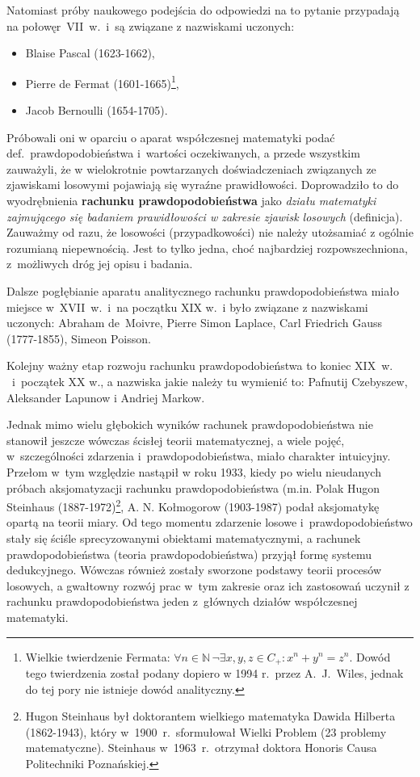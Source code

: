 \documentclass[10pt,a4paper]{article}
\begin{document}
Natomiast próby naukowego podejścia do odpowiedzi na to pytanie przypadają
na połowęr~VII~w.\ i~są związane z nazwiskami uczonych:
\begin{itemize}
  \item Blaise Pascal (1623-1662),
  \item Pierre de Fermat (1601-1665)\footnote{Wielkie twierdzenie Fermata:
      $\forall n\in\mathbb{N}\,\neg\exists x,y,z\in C_+: x^n+y^n=z^n$.
      Dowód tego twierdzenia został podany dopiero w 1994 r.\ przez A.\ J.\ Wiles,
      jednak do tej pory nie istnieje dowód analityczny.},
  \item Jacob Bernoulli (1654-1705).
\end{itemize}


Próbowali oni w oparciu o aparat współczesnej matematyki podać
def.~prawdopodobieństwa i~wartości oczekiwanych, a przede wszystkim zauważyli,
że w wielokrotnie powtarzanych doświadczeniach związanych ze zjawiskami losowymi
pojawiają się wyraźne prawidłowości. Doprowadziło to do wyodrębnienia
\textbf{rachunku prawdopodobieństwa} jako \textit{działu matematyki zajmującego
  się badaniem prawidłowości w zakresie zjawisk losowych} (definicja). Zauważmy
od razu, że losowości (przypadkowości) nie należy utożsamiać z ogólnie rozumianą
niepewnością. Jest to tylko jedna, choć najbardziej rozpowszechniona,
z~możliwych dróg jej opisu i badania.

Dalsze pogłębianie aparatu analitycznego rachunku prawdopodobieństwa miało
miejsce w~XVII~w.\ i~na początku XIX w.\ i było związane z nazwiskami uczonych:
Abraham de~Moivre, Pierre Simon Laplace, Carl Friedrich Gauss (1777-1855),
Simeon Poisson.

Kolejny ważny etap rozwoju rachunku prawdopodobieństwa to koniec XIX~w.
\ i~początek XX w., a nazwiska jakie należy tu wymienić to:
Pafnutij Czebyszew, Aleksander Lapunow i Andriej Markow.

Jednak mimo wielu głębokich wyników rachunek prawdopodobieństwa nie stanowił
jeszcze wówczas ścisłej teorii matematycznej, a wiele pojęć, w~szczególności
zdarzenia i~prawdopodobieństwa, miało charakter intuicyjny. Przełom w~tym
względzie nastąpił w roku 1933, kiedy po wielu nieudanych próbach aksjomatyzacji
rachunku prawdopodobieństwa (m.in. Polak Hugon Steinhaus (1887-1972)\footnote{Hugon
Steinhaus był doktorantem wielkiego matematyka Dawida Hilberta (1862-1943),
który w~1900~r.\ sformułował Wielki Problem (23 problemy matematyczne). Steinhaus
w~1963~r.\ otrzymał doktora Honoris Causa Politechniki Poznańskiej.},
A. N. Kołmogorow (1903-1987) podał aksjomatykę opartą na teorii
miary.  Od tego momentu zdarzenie losowe i~prawdopodobieństwo stały się ściśle
sprecyzowanymi obiektami matematycznymi, a rachunek prawdopodobieństwa (teoria
prawdopodobieństwa) przyjął formę systemu dedukcyjnego. Wówczas również zostały
sworzone podstawy teorii procesów losowych, a gwałtowny rozwój prac
w~tym zakresie oraz ich zastosowań uczynił z rachunku prawdopodobieństwa jeden
z~głównych działów współczesnej matematyki.
\end{document}
